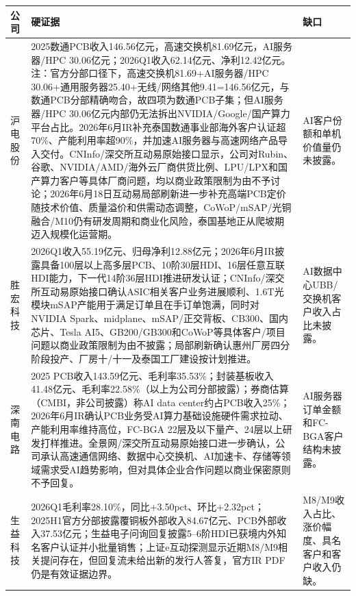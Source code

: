 \begin{exhibitbox}
\footnotesize
\begin{tabularx}{\textwidth}{L{1.6cm}X X}
\toprule
\textbf{公司} & \textbf{硬证据} & \textbf{缺口} \\
\midrule
沪电股份 & 2025数通PCB收入146.56亿元，高速交换机81.69亿元，AI服务器/HPC 30.06亿元；2026Q1收入62.14亿元、净利12.42亿元。注：官方分部口径下，高速交换机81.69+AI服务器/HPC 30.06+通用服务器25.40+无线/网络其他9.41=146.56亿元，与数通PCB分部精确吻合，故四项为数通PCB子集；但AI服务器/HPC 30.06亿元内部仍无法拆出NVIDIA/Google/国产算力平台占比。2026年6月IR补充泰国数通事业部海外客户认证超70\%、产能利用率超90\%，并加速AI服务器与高速网络产品导入交付。CNInfo/深交所互动易原始接口显示，公司对Rubin、谷歌、NVIDIA/AMD/海外云厂商供货比例、LPU/LPX和国产算力客户等具体厂商问题，均以商业政策限制为由不予讨论；2026年6月18日互动易局部刷新进一步补充高端PCB定价随技术价值、质量溢价和供需动态调整，CoWoP/mSAP/光铜融合/M10仍有研发周期和商业化风险，泰国基地正从爬坡期迈入规模化运营期。 & AI客户份额和单机价值量仍未披露。 \\
胜宏科技 & 2026Q1收入55.19亿元、归母净利12.88亿元；2026年6月IR披露具备100层以上高多层PCB、10阶30层HDI、16层任意互联HDI能力，下一代14阶36层HDI推进研发认证；CNInfo/深交所互动易原始接口确认ASIC相关客户业务进展顺利、1.6T光模块mSAP产能用于满足订单且在手订单饱满，同时对NVIDIA Spark、midplane、mSAP/正交背板、CB300、国内芯片、Tesla AI5、GB200/GB300和CoWoP等具体客户/项目问题以商业政策限制为由不披露；局部刷新确认惠州厂房四分阶段投产、厂房十/十一及泰国工厂建设按计划推进。 & AI数据中心UBB/交换机客户收入占比未披露。 \\
深南电路 & 2025 PCB收入143.59亿元、毛利率35.53\%；封装基板收入41.48亿元、毛利率22.58\%（以上为公司分部披露）；券商估算（CMBI，非公司披露）称AI data center约占PCB收入25\%；2026年6月IR确认PCB业务受AI算力基础设施硬件需求拉动、产能利用率维持高位，FC-BGA 22层及以下量产、24层以上研发打样推进。全景网/深交所互动易原始接口进一步确认，公司承认高速通信网络、数据中心交换机、AI加速卡、存储等领域需求受AI趋势影响，但对具体企业合作问题以商业保密原则不予回复。 & AI服务器订单金额和FC-BGA客户结构未披露。 \\
生益科技 & 2026Q1毛利率28.10\%，同比+3.50pct、环比+2.32pct；2025H1官方分部披露覆铜板外部收入84.67亿元、PCB外部收入37.53亿元；生益电子问询回复披露5--6阶HDI已获境内外知名客户认证并小批量销售；上证e互动探测显示近期M8/M9相关提问存在，但回复流未给出新的发行人答复，官方IR PDF仍是有效证据边界。 & M8/M9收入占比、涨价幅度、具名客户和客户收入仍缺。 \\

\end{tabularx}
\end{exhibitbox}
